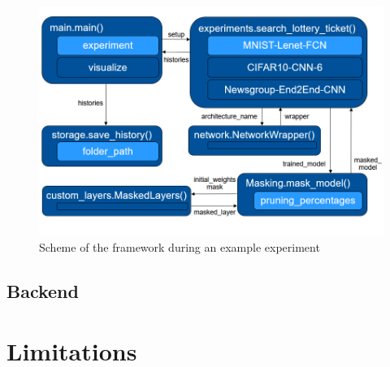 \begin{figure}
	\centering
	\includegraphics[width=450px]{gfx/chp_5_control_flow.png}
	\caption{Scheme of the framework during an example experiment}
	\label{fig:Example Control Flow}
\end{figure}
\subsection{Backend}

\section{Limitations}